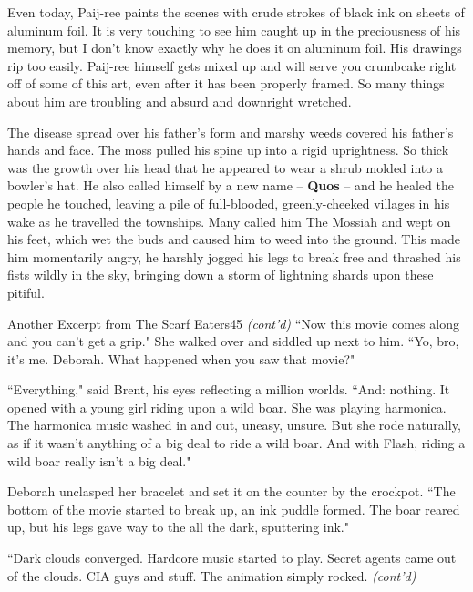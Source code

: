 \documentclass[12pt,twoside]{report}
\begin{document}
Even today, Paij-ree paints the scenes with crude strokes of black ink
on sheets of aluminum foil.  It is very touching to see him caught up
in the preciousness of his memory, but I don't know exactly why he
does it on aluminum foil.  His drawings rip too easily.  Paij-ree
himself gets mixed up and will serve you crumbcake right off of some
of this art, even after it has been properly framed.  So many things
about him are troubling and absurd and downright wretched.

The disease spread over his father's form and marshy weeds covered his
father's hands and face.  The moss pulled his spine up into a rigid
uprightness.  So thick was the growth over his head that he appeared
to wear a shrub molded into a bowler's hat.  He also called himself by
a new name -- {\bf Quos} -- and he healed the people he touched,
leaving a pile of full-blooded, greenly-cheeked villages in his wake
as he travelled the townships.  Many called him The Mossiah and wept
on his feet, which wet the buds and caused him to weed into the
ground.  This made him momentarily angry, he harshly jogged his legs
to break free and thrashed his fists wildly in the sky, bringing down
a storm of lightning shards upon these pitiful.

	\begin{sidebar}{Another Excerpt from The Scarf Eaters}{45}
		\textit{(cont'd)} ``Now this movie comes along and you can't get a grip." She walked over and siddled up next to him. ``Yo, bro, it's me. Deborah. What happened when you saw that movie?"\vspace{6pt}
		
		``Everything," said Brent, his eyes reflecting a million worlds. ``And: nothing. It opened with a young girl riding upon a wild boar. She was playing harmonica. The harmonica music washed in and out, uneasy, unsure. But she rode naturally, as if it wasn't anything of a big deal to ride a wild boar. And with Flash, riding a wild boar really isn't a big deal."\vspace{6pt}

		Deborah unclasped her bracelet and set it on the counter by the crockpot.
		``The bottom of the movie started to break up, an ink puddle formed. The boar reared up, but his legs gave way to the all the dark, sputtering ink."\vspace{6pt}

		``Dark clouds converged. Hardcore music started to play. Secret agents came out of the clouds. CIA guys and stuff. The animation simply rocked. \textit{(cont'd)}
	\end{sidebar}
\end{document}
